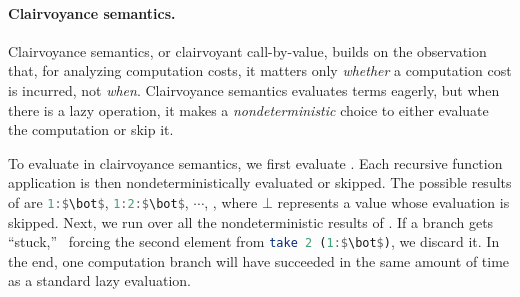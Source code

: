% 


\paragraph{Clairvoyance semantics.} Clairvoyance semantics, or clairvoyant
call-by-value, builds on the observation that, for analyzing computation costs,
it matters only \emph{whether} a computation cost is incurred, not
\emph{when}. Clairvoyance semantics evaluates terms eagerly, but when there is a
lazy operation, it makes a \emph{nondeterministic} choice to either evaluate the
computation or skip it.

To evaluate  in clairvoyance semantics, we first
evaluate \cdh{[1,2,3] ++ [4,5]}. Each recursive function application is then
nondeterministically evaluated or skipped. The possible results of \cdh{[1,2,3]
  ++ [4,5]} are
\lstinline[language=Haskell,breakatwhitespace,mathescape]{1:$\bot$},
\lstinline[language=Haskell,breakatwhitespace,mathescape]{1:2:$\bot$}, $\cdots$,
\cdh{[1,2,3,4,5]}, where $\bot$ represents a value whose evaluation is skipped.
Next, we run  over all the nondeterministic results of \cdh{[1,2,3]
  ++ [4,5]}. If a branch gets ``stuck,'' \eg~forcing the second element from
\lstinline[language=Haskell,breakatwhitespace,mathescape]{take 2 (1:$\bot$)}, we
discard it. In the end, one computation branch will have succeeded in the same
amount of time as a standard lazy evaluation.

